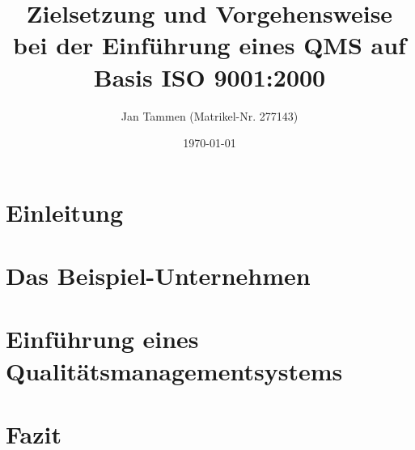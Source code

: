 \documentclass[
	a4paper,     		%
	headsepline, 		%
	footsepline, 		%
	titlepage,   		%
	12pt,        		%
]{scrreprt}
\title{Zielsetzung und Vorgehensweise bei der Einführung eines QMS auf Basis ISO
9001:2000}
\author{%
  Jan Tammen (Matrikel-Nr. 277143)
}%
\date{\today}
\begin{document}
\maketitle

\tableofcontents

\chapter{Einleitung}


\chapter{Das Beispiel-Unternehmen}


\chapter{Einführung eines Qualitätsmanagementsystems}


\chapter{Fazit}





\renewcommand{\bibname}{Quellen}



\end{document}
